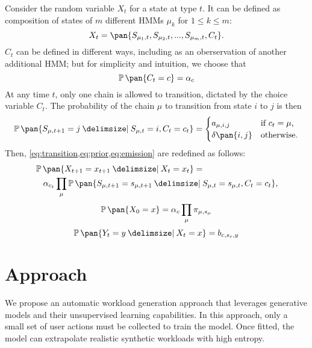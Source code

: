 Consider the random variable \(X_t\) for a state at type \(t\). It can be defined as composition of states of \(m\) different HMMs \(\mu_k\) for \(1 \leq k \leq m\):
\begin{equation}
    X_t = \pan{S_{\mu_1,t}, S_{\mu_2,t}, ..., S_{\mu_m,t}, C_t}.
\end{equation}
\(C_t\) can be defined in different ways, including as an oberservation of another additional HMM; but for simplicity and intuition, we choose that
\begin{equation}
    \prob\pan{C_t = c} = \alpha_c
\end{equation}
At any time \(t\), only one chain is allowed to transition, dictated by the choice variable \(C_t\). The probability of the chain \(\mu\) to transition from state \(i\) to \(j\) is then
\begin{equation}
    \prob\pan{S_{\mu,t+1} = j \giv S_{\mu,t} = i, C_t = c_t} = \begin{cases}
        a_{\mu,i,j} & \text{if $c_t = \mu$,} \\
        \delta\pan{i, j} & \text{otherwise.} \\
    \end{cases}
\end{equation}
Then, \cref{eq:transition,eq:prior,eq:emission} are redefined as follows:
\begin{equation}
    \begin{multlined}
        \prob\pan{X_{t + 1} = x_{t+1} \giv X_t = x_t} = \\
        \alpha_{c_t}\prod_{\mu} \prob\pan{S_{\mu,t+1} = s_{\mu,t+1} \giv S_{\mu,t} = s_{\mu,t}, C_t = c_t},
    \end{multlined}
\end{equation}
\begin{equation}
    \prob\pan{X_0 = x} = \alpha_c \prod_\mu \pi_{\mu,s_\mu}
\end{equation}
\begin{equation}
    \prob\pan{Y_t = y \giv X_t = x} = b_{c,s_c,y}
\end{equation}

\section{Approach}\label{sec:approach}

We propose an automatic workload generation approach that leverages generative models and their unsupervised learning capabilities. In this approach, only a small set of user actions must be collected to train the model. Once fitted, the model can extrapolate realistic synthetic workloads with high entropy.

